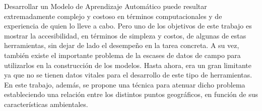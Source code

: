   \par Desarrollar un Modelo de Aprendizaje Automático puede resultar extremadamente
    complejo y costoso en términos computacionales y de experiencia de quien lo lleve
    a cabo. Pero uno de los objetivos de este trabajo es mostrar la accesibilidad,
    en términos de simpleza y costos, de algunas de estas herramientas, sin dejar
    de lado el desempeño en la tarea concreta. A su vez, también existe el importante problema
    de la escases de datos de campo para utilizarlos en la construcción de los modelos.
    Hasta ahora, era un gran limitante ya que no se tienen datos vitales
    para el desarrollo de este tipo de herramientas. En este trabajo, además, se
    propone una técnica para atenuar dicho problema estableciendo una relación
    entre los distintos puntos geográficos, en función de sus características ambientales.



